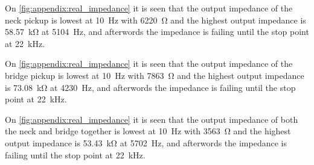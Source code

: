 On \autoref{fig:appendix:real_impedance} it is seen that the output impedance of the neck pickup is lowest at \SI{10}{\hertz} with \SI{6220}{\ohm}  and the highest output impedance is \SI{58,57}{\kilo\ohm} at \SI{5104}{\hertz}, and afterwords the impedance is failing until the stop point at \SI{22}{\kilo\hertz}.

On  \autoref{fig:appendix:real_impedance} it is seen that the output impedance of the bridge pickup is lowest at \SI{10}{\hertz} with \SI{7863}{\ohm}  and the highest output impedance is \SI{73,08}{\kilo\ohm} at \SI{4230}{\hertz}, and afterwords the impedance is failing until the stop point at \SI{22}{\kilo\hertz}.

On  \autoref{fig:appendix:real_impedance} it is seen that the output impedance of both the neck and bridge together is lowest at \SI{10}{\hertz} with \SI{3563}{\ohm}  and the highest output impedance is \SI{53,43}{\kilo\ohm} at \SI{5702}{\hertz}, and afterwords the impedance is failing until the stop point at \SI{22}{\kilo\hertz}.